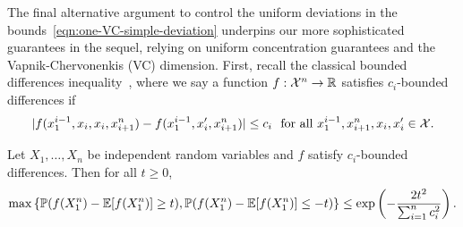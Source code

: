 \documentclass{article}
\begin{document}
The final alternative argument to control the uniform deviations
in the bounds~\eqref{eqn:one-VC-simple-deviation} underpins
our more sophisticated guarantees in the sequel,
relying on uniform concentration guarantees and the
Vapnik-Chervonenkis (VC) dimension.
%
First, recall the classical bounded differences
inequality~\cite{McDiarmid89, Wainwright19}, where we say a function $f :
\mathcal{X}^n \to \mathbb{R}$ satisfies $c_i$-bounded differences if
\begin{equation*}
  |f(x_1^{i-1}, x_i, x_i, x_{i + 1}^n)
  - f(x_1^{i-1}, x_i', x_{i+1}^n)|
  \le c_i
  ~~ \mbox{for~all~} x_1^{i-1}, x_{i+1}^n,
  x_i, x_i' \in \mathcal{X}.
\end{equation*}
\begin{lemma}
  \label{lemma:bounded-differences}
  Let $X_1, \ldots, X_n$ be independent random variables
  and $f$ satisfy $c_i$-bounded differences. Then
  for all $t \ge 0$,
  \begin{equation*}
    \max\left\{
    \mathbb{P}(f(X_1^n) - \mathbb{E}[f(X_1^n)] \ge t),
    \mathbb{P}(f(X_1^n) - \mathbb{E}[f(X_1^n)] \le -t)
    \right\}
    \le \exp\left(-\frac{2 t^2}{\sum_{i = 1}^n c_i^2}\right).
  \end{equation*}
\end{lemma}
\end{document}
